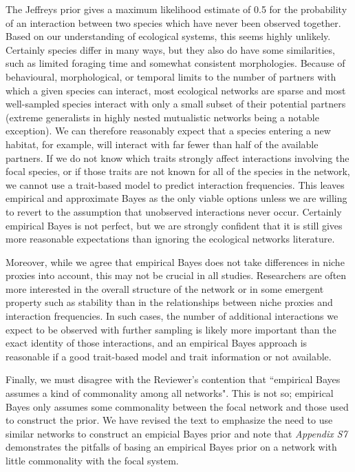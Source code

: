 \documentclass[12pt]{letter}
\begin{document}
		The Jeffreys prior gives a maximum likelihood estimate of 0.5 for the probability of an interaction between two species which have never been observed together. Based on our understanding of ecological systems, this seems highly unlikely. Certainly species differ in many ways, but they also do have some similarities, such as limited foraging time and somewhat consistent morphologies. Because of behavioural, morphological, or temporal limits to the number of partners with which a given species can interact, most ecological networks are sparse and most well-sampled species interact with only a small subset of their potential partners (extreme generalists in highly nested mutualistic networks being a notable exception). We can therefore reasonably expect that a species entering a new habitat, for example, will interact with far fewer than half of the available partners. If we do not know which traits strongly affect interactions involving the focal species, or if those traits are not known for all of the species in the network, we cannot use a trait-based model to predict interaction frequencies. This leaves empirical and approximate Bayes as the only viable options unless we are willing to revert to the assumption that unobserved interactions never occur. Certainly empirical Bayes is not perfect, but we are strongly confident that it is still gives more reasonable expectations than ignoring the ecological networks literature.


		Moreover, while we agree that empirical Bayes does not take differences in niche proxies into account, this may not be crucial in all studies. Researchers are often more interested in the overall structure of the network or in some emergent property such as stability than in the relationships between niche proxies and interaction frequencies. In such cases, the number of additional interactions we expect to be observed with further sampling is likely more important than the exact identity of those interactions, and an empirical Bayes approach is reasonable if a good trait-based model and trait information or not available. 


		Finally, we must disagree with the Reviewer's contention that ``empirical Bayes assumes a kind of commonality among all networks". This is not so; empirical Bayes only assumes some commonality between the focal network and those used to construct the prior. We have revised the text to emphasize the need to use similar networks to construct an empicial Bayes prior and note that \emph{Appendix S7} demonstrates the pitfalls of basing an empirical Bayes prior on a network with little commonality with the focal system. 
\end{document}
